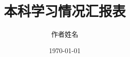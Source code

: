 \documentclass{./Depends/weeklyreport}
\title{本科学习情况汇报表}
\author{作者姓名} %
\date{\today} %
\begin{document}
\begin{weeklyreport}
	\learningcontents
	{
	}
	\readingcontents
	{
	}
	\problemsandsolutions
	{
	}
	\plansnextweek
	{
	}
	\achievementsandexperiences
	{
	}
\end{weeklyreport}

\Ipromisenofoolingborlying 
\end{document}
